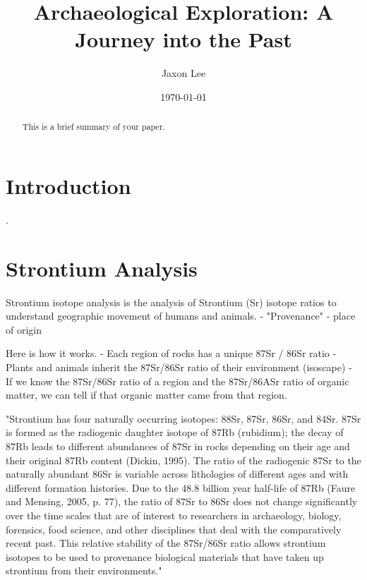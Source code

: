 \documentclass[a4paper, 12pt]{article}
\title{Archaeological Exploration: A Journey into the Past}
\author{Jaxon Lee}
\date{\today}
\begin{document}
\maketitle

\begin{abstract}
    This is a brief summary of your paper.
\end{abstract}

\section{Introduction}

\cite{johnson2005}.

\section{Strontium Analysis}

Strontium isotope analysis is the analysis of Strontium (Sr) isotope ratios to
understand geographic movement of humans and animals.
- "Provenance" - place of origin

Here is how it works.
- Each region of rocks has a unique 87Sr / 86Sr ratio
- Plants and animals inherit the 87Sr/86Sr ratio of their environment (isoscape)
- If we know the 87Sr/86Sr ratio of a region and the 87Sr/86ASr ratio of organic matter, we can tell if that organic matter came from that region.

"Strontium has four naturally occurring isotopes: 88Sr, 87Sr, 86Sr, and 84Sr. 87Sr is formed as the radiogenic daughter isotope of 87Rb (rubidium); the decay of 87Rb leads to different abundances of 87Sr in rocks depending on their age and their original 87Rb content (Dickin, 1995). The ratio of the radiogenic 87Sr to the naturally abundant 86Sr is variable across lithologies of different ages and with different formation histories. Due to the 48.8 billion year half-life of 87Rb (Faure and Mensing, 2005, p. 77), the ratio of 87Sr to 86Sr does not change significantly over the time scales that are of interest to researchers in archaeology, biology, forensics, food science, and other disciplines that deal with the comparatively recent past. This relative stability of the 87Sr/86Sr ratio allows strontium isotopes to be used to provenance biological materials that have taken up strontium from their environments."
\end{document}
